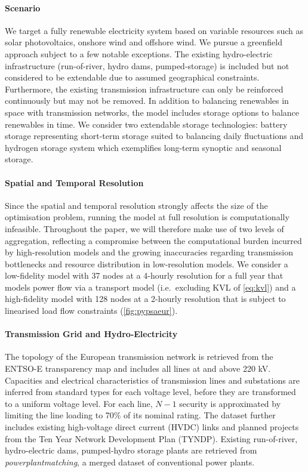 \paragraph{Scenario}
We target a fully renewable electricity system based on variable resources
such as solar photovoltaics, onshore wind and offshore wind.
We pursue a greenfield approach subject to a few notable exceptions.
The existing hydro-electric infrastructure (run-of-river, hydro dams, pumped-storage)
is included but not considered to be extendable due to assumed geographical constraints.
Furthermore, the existing transmission infrastructure can only
be reinforced continuously but may not be removed.
In addition to balancing renewables in space with transmission networks,
the model includes storage options to balance renewables in time.
We consider two extendable storage technologies:
battery storage representing short-term storage suited to balancing daily fluctuations and
hydrogen storage system which exemplifies long-term synoptic and seasonal storage.

\paragraph{Spatial and Temporal Resolution}
Since the spatial and temporal resolution strongly affects the size of the optimisation problem,
running the model at full resolution is computationally infeasible.
Throughout the paper, we will therefore make use of two levels of aggregation,
reflecting a compromise between the computational burden incurred by high-resolution models and
the growing inaccuracies regarding transmission bottlenecks
and resource distribution in low-resolution models.
We consider a low-fidelity model with 37 nodes at a 4-hourly resolution for a full year
that models power flow via a transport model (i.e.~excluding KVL of \cref{eq:kvl}) and
a high-fidelity model with 128 nodes at a 2-hourly resolution
that is subject to linearised load flow constraints (\cref{fig:pypsaeur}).


\paragraph{Transmission Grid and Hydro-Electricity}
The topology of the European transmission network is retrieved
from the ENTSO-E transparency map and includes all lines at and above 220 kV.
Capacities and electrical characteristics of transmission lines and substations are
inferred from standard types for each voltage level, before they are transformed to
a uniform voltage level.
For each line, $N-1$ security is approximated by limiting the line loading to 70\% of its nominal rating.
The dataset further includes existing high-voltage direct current (HVDC) links and planned projects from the
Ten Year Network Development Plan (TYNDP).
Existing run-of-river, hydro-electric dams, pumped-hydro storage plants
are retrieved from \textit{powerplantmatching}, a merged dataset of conventional power plants.

